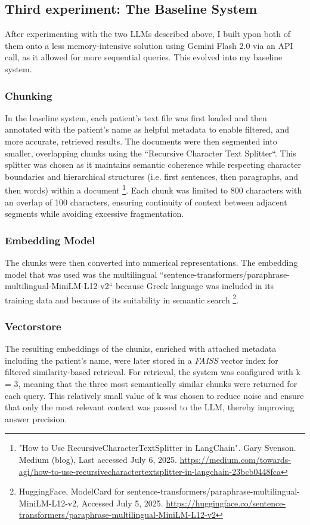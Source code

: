 \subsection{Third experiment: The Baseline System}
After experimenting with the two LLMs described above, I built ypon both of them onto a less memory-intensive solution using Gemini Flash 2.0 via an API call, as it allowed for more sequential queries. This evolved into my baseline system.

\subsubsection{Chunking}
In the baseline system, each patient’s text file was first loaded and then annotated with the patient’s name as helpful metadata to enable filtered, and more accurate, retrieved results. The documents were then segmented into smaller, overlapping chunks using the ``Recursive Character Text Splitter``. This splitter was chosen as it maintains semantic coherence while respecting character boundaries and hierarchical structures (i.e. first sentences, then paragraphs, and then words) within a document \footnote{"How to Use RecursiveCharacterTextSplitter in LangChain". Gary Svenson. Medium (blog), Last accessed July 6, 2025.  \url{https://medium.com/towards-agi/how-to-use-recursivecharactertextsplitter-in-langchain-23bcb0448fca}}. Each chunk was limited to 800 characters with an overlap of 100 characters, ensuring continuity of context between adjacent segments while avoiding excessive fragmentation. 

\subsubsection{Embedding Model}
The chunks were then converted into numerical representations. The embedding model that was used was the multilingual ``sentence-transformers/paraphrase-multilingual-MiniLM-L12-v2`` because Greek language was included in its training data and because of its suitability in semantic search \footnote{HuggingFace, ModelCard for sentence-transformers/paraphrase-multilingual-MiniLM-L12-v2, Accessed July 5, 2025. \url{https://huggingface.co/sentence-transformers/paraphrase-multilingual-MiniLM-L12-v2}}. 

\subsubsection{Vectorstore}
The resulting embeddings of the chunks, enriched with attached metadata including the patient's name, were later stored in a \textit{FAISS} vector index for filtered similarity-based retrieval. For retrieval, the system was configured with k = 3, meaning that the three most semantically similar chunks were returned for each query. This relatively small value of k was chosen to reduce noise and ensure that only the most relevant context was passed to the LLM, thereby improving answer precision.

